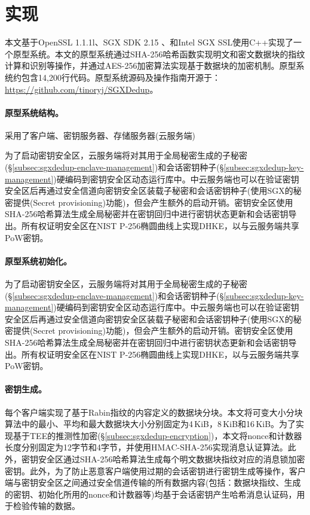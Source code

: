 \section{\sysnameS 实现}
\label{sec:sgxdedup-implementation}

本文基于OpenSSL 1.1.1l、SGX SDK 2.15 、和Intel SGX SSL使用C++实现了一个\sysnameS 原型系统。本文的原型系统通过SHA-256哈希函数实现明文和密文数据块的指纹计算和识别等操作，并通过AES-256加密算法实现基于数据块的加密机制。原型系统约包含14,200行代码。原型系统源码及操作指南开源于：\href{https://github.com/tinoryj/SGXDedup}{https://github.com/tinoryj/SGXDedup}。

\paragraph*{原型系统结构。}

\sysnameS 采用了客户端、密钥服务器、存储服务器(云服务端)

为了启动密钥安全区，云服务端将对其用于全局秘密生成的子秘密(\S\ref{subsec:sgxdedup-enclave-management})和会话密钥种子(\S\ref{subsec:sgxdedup-key-management})硬编码到密钥安全区动态运行库中。\sysnameS 中云服务端也可以在验证密钥安全区后再通过安全信道向密钥安全区装载子秘密和会话密钥种子(使用SGX的秘密提供(Secret provisioning)功能)，但会产生额外的启动开销。密钥安全区使用SHA-256哈希算法生成全局秘密并在密钥回归中进行密钥状态更新和会话密钥导出。所有权证明安全区在NIST P-256椭圆曲线上实现DHKE，以与云服务端共享PoW密钥。


\paragraph*{原型系统初始化。}
为了启动密钥安全区，云服务端将对其用于全局秘密生成的子秘密(\S\ref{subsec:sgxdedup-enclave-management})和会话密钥种子(\S\ref{subsec:sgxdedup-key-management})硬编码到密钥安全区动态运行库中。\sysnameS 中云服务端也可以在验证密钥安全区后再通过安全信道向密钥安全区装载子秘密和会话密钥种子(使用SGX的秘密提供(Secret provisioning)功能)，但会产生额外的启动开销。密钥安全区使用SHA-256哈希算法生成全局秘密并在密钥回归中进行密钥状态更新和会话密钥导出。所有权证明安全区在NIST P-256椭圆曲线上实现DHKE，以与云服务端共享PoW密钥。

\paragraph*{密钥生成。}每个客户端实现了基于Rabin指纹的内容定义的数据块分块。本文将可变大小分块算法中的最小、平均和最大数据块大小分别固定为4\,KiB，8\,KiB和16\,KiB。为了实现基于TEE的推测性加密(\S\ref{subsec:sgxdedup-encryption})，本文将nonce和计数器长度分别固定为12字节和4字节，并使用HMAC-SHA-256实现消息认证算法。此外，密钥安全区通过SHA-256哈希算法生成每个明文数据块指纹对应的消息锁加密密钥。此外，为了防止恶意客户端使用过期的会话密钥进行密钥生成等操作，客户端与密钥安全区之间通过安全信道传输的所有数据内容(包括：数据块指纹、生成的密钥、初始化所用的nonce和计数器等)均基于会话密钥产生哈希消息认证码，用于检验传输的数据。


